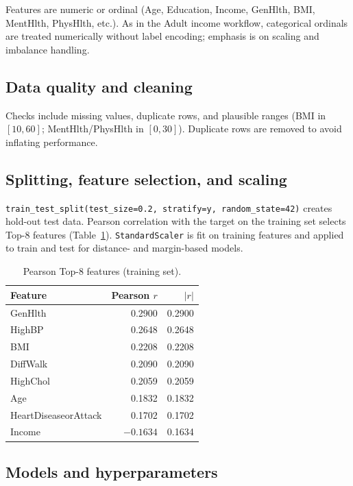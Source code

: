 \documentclass[11pt,a4paper]{article}
\begin{document}
Features are numeric or ordinal (Age, Education, Income, GenHlth, BMI, MentHlth, PhysHlth, etc.). As in the Adult income workflow, categorical ordinals are treated numerically without label encoding; emphasis is on scaling and imbalance handling.

\subsection{Data quality and cleaning}\label{sec:method-qc}

Checks include missing values, duplicate rows, and plausible ranges (BMI in $[10,60]$; MentHlth/PhysHlth in $[0,30]$). Duplicate rows are removed to avoid inflating performance.

\subsection{Splitting, feature selection, and scaling}\label{sec:method-split}

\lstinline{train_test_split(test_size=0.2, stratify=y, random_state=42)} creates hold-out test data. Pearson correlation with the target on the training set selects Top-8 features (Table~\ref{tab:top8}). \lstinline{StandardScaler} is fit on training features and applied to train and test for distance- and margin-based models.

\begin{table}[htbp]
\centering
\caption{Pearson Top-8 features (training set).}
\label{tab:top8}
\begin{tabular}{lrr}
\toprule
Feature & Pearson $r$ & $|r|$ \\
\midrule
GenHlth & 0.2900 & 0.2900 \\
HighBP & 0.2648 & 0.2648 \\
BMI & 0.2208 & 0.2208 \\
DiffWalk & 0.2090 & 0.2090 \\
HighChol & 0.2059 & 0.2059 \\
Age & 0.1832 & 0.1832 \\
HeartDiseaseorAttack & 0.1702 & 0.1702 \\
Income & $-0.1634$ & 0.1634 \\
\bottomrule
\end{tabular}
\end{table}

\subsection{Models and hyperparameters}\label{sec:method-models}
\end{document}
